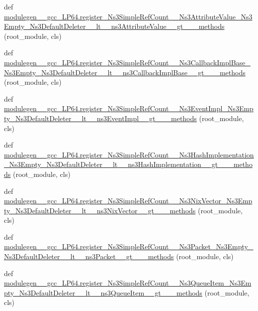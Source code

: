 \begin{DoxyCompactItemize}
def \hyperlink{namespacemodulegen____gcc__LP64_abcd5829b1993ba7d28274b9959f71417}{modulegen\+\_\+\+\_\+gcc\+\_\+\+L\+P64.\+register\+\_\+\+Ns3\+Simple\+Ref\+Count\+\_\+\+\_\+\+Ns3\+Attribute\+Value\+\_\+\+Ns3\+Empty\+\_\+\+Ns3\+Default\+Deleter\+\_\+\+\_\+lt\+\_\+\+\_\+ns3\+Attribute\+Value\+\_\+\+\_\+gt\+\_\+\+\_\+\+\_\+methods} (root\+\_\+module, cls)
\item 
def \hyperlink{namespacemodulegen____gcc__LP64_abad80b77479df17974cc787f14a2406f}{modulegen\+\_\+\+\_\+gcc\+\_\+\+L\+P64.\+register\+\_\+\+Ns3\+Simple\+Ref\+Count\+\_\+\+\_\+\+Ns3\+Callback\+Impl\+Base\+\_\+\+Ns3\+Empty\+\_\+\+Ns3\+Default\+Deleter\+\_\+\+\_\+lt\+\_\+\+\_\+ns3\+Callback\+Impl\+Base\+\_\+\+\_\+gt\+\_\+\+\_\+\+\_\+methods} (root\+\_\+module, cls)
\item 
def \hyperlink{namespacemodulegen____gcc__LP64_a0545c365b0db77cf144c477216b1292c}{modulegen\+\_\+\+\_\+gcc\+\_\+\+L\+P64.\+register\+\_\+\+Ns3\+Simple\+Ref\+Count\+\_\+\+\_\+\+Ns3\+Event\+Impl\+\_\+\+Ns3\+Empty\+\_\+\+Ns3\+Default\+Deleter\+\_\+\+\_\+lt\+\_\+\+\_\+ns3\+Event\+Impl\+\_\+\+\_\+gt\+\_\+\+\_\+\+\_\+methods} (root\+\_\+module, cls)
\item 
def \hyperlink{namespacemodulegen____gcc__LP64_a38845cc78a4819d6d5632f27e6fd34d9}{modulegen\+\_\+\+\_\+gcc\+\_\+\+L\+P64.\+register\+\_\+\+Ns3\+Simple\+Ref\+Count\+\_\+\+\_\+\+Ns3\+Hash\+Implementation\+\_\+\+Ns3\+Empty\+\_\+\+Ns3\+Default\+Deleter\+\_\+\+\_\+lt\+\_\+\+\_\+ns3\+Hash\+Implementation\+\_\+\+\_\+gt\+\_\+\+\_\+\+\_\+methods} (root\+\_\+module, cls)
\item 
def \hyperlink{namespacemodulegen____gcc__LP64_a965e9b7942715fc406cf9c83246b2bcb}{modulegen\+\_\+\+\_\+gcc\+\_\+\+L\+P64.\+register\+\_\+\+Ns3\+Simple\+Ref\+Count\+\_\+\+\_\+\+Ns3\+Nix\+Vector\+\_\+\+Ns3\+Empty\+\_\+\+Ns3\+Default\+Deleter\+\_\+\+\_\+lt\+\_\+\+\_\+ns3\+Nix\+Vector\+\_\+\+\_\+gt\+\_\+\+\_\+\+\_\+methods} (root\+\_\+module, cls)
\item 
def \hyperlink{namespacemodulegen____gcc__LP64_ad03a2df5680530337afef71c06f6d20d}{modulegen\+\_\+\+\_\+gcc\+\_\+\+L\+P64.\+register\+\_\+\+Ns3\+Simple\+Ref\+Count\+\_\+\+\_\+\+Ns3\+Packet\+\_\+\+Ns3\+Empty\+\_\+\+Ns3\+Default\+Deleter\+\_\+\+\_\+lt\+\_\+\+\_\+ns3\+Packet\+\_\+\+\_\+gt\+\_\+\+\_\+\+\_\+methods} (root\+\_\+module, cls)
\item 
def \hyperlink{namespacemodulegen____gcc__LP64_ac462dc8a463530ea95f3aff149540d9d}{modulegen\+\_\+\+\_\+gcc\+\_\+\+L\+P64.\+register\+\_\+\+Ns3\+Simple\+Ref\+Count\+\_\+\+\_\+\+Ns3\+Queue\+Item\+\_\+\+Ns3\+Empty\+\_\+\+Ns3\+Default\+Deleter\+\_\+\+\_\+lt\+\_\+\+\_\+ns3\+Queue\+Item\+\_\+\+\_\+gt\+\_\+\+\_\+\+\_\+methods} (root\+\_\+module, cls)

\end{DoxyCompactItemize}
